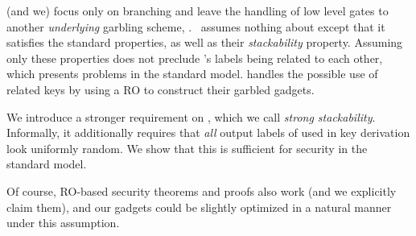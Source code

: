 
\HK (and we)
focus only on branching and leave the handling of low level gates to
another \emph{underlying} garbling scheme, \underscheme.
\HK\ assumes nothing about \underscheme except that it satisfies the standard
\cite{CCS:BelHoaRog12} properties, as well as their {\em stackability} property.
Assuming only  these properties does not preclude \underscheme's
labels being related to each other, which presents problems in the
standard model. \HK handles the possible use of related keys by using
a RO to construct their garbled gadgets.

We introduce a stronger requirement on \underscheme, which we call {\em strong stackability}.  Informally, it additionally requires that {\em all} output labels of \underscheme used in key derivation look uniformly random.  We show that this is sufficient for security in the standard model.

Of course, RO-based security theorems and proofs also work (and we explicitly claim them), and our gadgets could be slightly optimized in a natural manner under this assumption.





